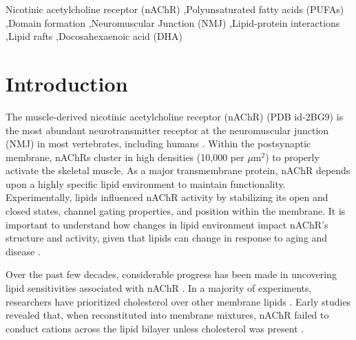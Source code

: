 \documentclass[final,3p,times,twocolumn]{elsarticle}
\begin{document}
\begin{frontmatter}
\begin{abstract}
\end{abstract}

\begin{keyword}
Nicotinic acetylcholine receptor (nAChR) \sep Polyunsaturated fatty acids (PUFAs) \sep Domain formation \sep Neuromuscular Junction (NMJ) \sep Lipid-protein interactions \sep Lipid rafts \sep Docosahexaenoic acid (DHA)


\end{keyword}

\end{frontmatter}

\linenumbers

\section{Introduction}
\label{S:1}
The muscle-derived nicotinic acetylcholine receptor (nAChR) (PDB id-2BG9)\cite{Unwin2005} is the most abundant neurotransmitter receptor at the neuromuscular junction (NMJ) in most vertebrates, including humans \cite{Albuquerque2009}. Within the postsynaptic membrane, nAChRs cluster in high densities (10,000 per $\mu$m$^{2}$) to properly activate the skeletal muscle\cite{Ramarao1998,Breckenridge1972}. As a major transmembrane protein, nAChR depends upon a highly specific lipid environment to maintain functionality. Experimentally, lipids influenced nAChR activity by stabilizing its open and closed states\cite{Criado1982}, channel gating properties\cite{daCosta_A_2013}, and position within the membrane\cite{Almarza2014}. It is important to understand how changes in lipid environment impact nAChR's structure and activity, given that lipids can change in response to aging and disease \cite{Yadav2014}. 

Over the past few decades, considerable progress has been made in uncovering lipid sensitivities associated with nAChR \cite{Criado1982}. In a majority of experiments, researchers have prioritized cholesterol over other membrane lipids \cite{Narayanaswami1993,Leibel1987,Marsh1978,POPOT1978}. Early studies revealed that, when reconstituted into membrane mixtures, nAChR failed to conduct cations across the lipid bilayer unless cholesterol was present \cite{Fong_Correlation_1986,Sunshine_Lipid_1992,Butler1993,Fong_Stabilization_1987,Corrie_Lipid_2002}. 
\end{document}
